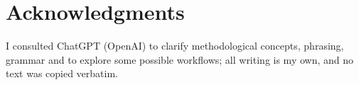 \section{Acknowledgments}
I consulted ChatGPT (OpenAI) to clarify methodological concepts, phrasing, grammar and to explore some possible workflows; all writing is my own, and no text was copied verbatim.